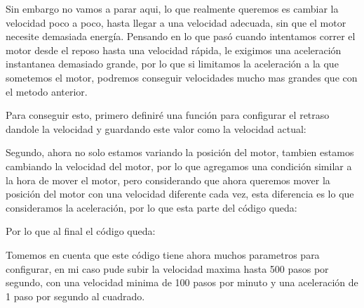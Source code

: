 		\begin{fullwidth}
			\begin{multicols}{2}
				
			\end{multicols}
		\end{fullwidth}

		Sin embargo no vamos a parar aqui, lo que realmente queremos es cambiar la velocidad poco a poco, hasta llegar a una velocidad adecuada, sin que el motor necesite demasiada energía. Pensando en lo que pasó cuando intentamos correr el motor desde el reposo hasta una velocidad rápida, le exigimos una aceleración instantanea demasiado grande, por lo que si limitamos la aceleración a la que sometemos el motor, podremos conseguir velocidades mucho mas grandes que con el metodo anterior.

		Para conseguir esto, primero definiré una función para configurar el retraso dandole la velocidad y guardando este valor como la velocidad actual:

		

		Segundo, ahora no solo estamos variando la posición del motor, tambien estamos cambiando la velocidad del motor, por lo que agregamos una condición similar a la hora de mover el motor, pero considerando que ahora queremos mover la posición del motor con una velocidad diferente cada vez, esta diferencia es lo que consideramos la aceleración, por lo que esta parte del código queda:

		

		Por lo que al final el código queda:

		\newpage

		\begin{fullwidth}
			\begin{multicols}{2}
				
			\end{multicols}
		\end{fullwidth}

		Tomemos en cuenta que este código tiene ahora muchos parametros para configurar, en mi caso pude subir la velocidad maxima hasta 500 pasos por segundo, con una velocidad minima de 100 pasos por minuto y una aceleración de 1 paso por segundo al cuadrado.

